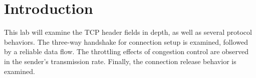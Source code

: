 \section{Introduction}\label{sec:intro}
This lab will examine the TCP header fields in depth, as well as several protocol behaviors.
The three-way handshake for connection setup is examined, followed by a reliable data flow.
The throttling effects of congestion control are observed in the sender's transmission rate.
Finally, the connection release behavior is examined.
